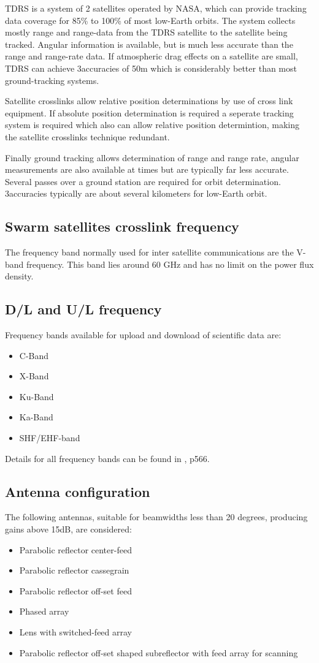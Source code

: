 TDRS is a system of 2 satellites operated by NASA, which can provide tracking data coverage for 85\% to 100\% of most low-Earth orbits. The system collects mostly range and range-data from the TDRS satellite to the satellite being tracked. Angular information is available, but is much less accurate than the range and range-rate data. If atmospheric drag effects on a satellite are small, TDRS can achieve 3\sigma accuracies of 50m which is considerably better than most ground-tracking systems.

Satellite crosslinks allow relative position determinations by use of cross link equipment. If absolute position determination is required a seperate tracking system is required which also can allow relative position determintion, making the satellite crosslinks technique redundant.

Finally ground tracking allows determination of range and range rate, angular measurements are also available at times but are typically far less accurate. Several passes over a ground station are required for orbit determination. 3\sigma accuracies typically are about several kilometers for low-Earth orbit.

\subsection{Swarm satellites crosslink frequency}
The frequency band normally used for inter satellite communications are the V-band frequency. This band lies around 60 GHz and has no limit on the power flux density.

\subsection{D/L and U/L frequency}
Frequency bands available for upload and download of scientific data are:
\begin{itemize}
\item C-Band
\item X-Band
\item Ku-Band
\item Ka-Band
\item SHF/EHF-band
\end{itemize}

Details for all frequency bands can be found in \cite{Larson}, p566.

\subsection{Antenna configuration}
The following antennas, suitable for beamwidths less than 20 degrees, producing gains above 15dB, are considered:
\begin{itemize}
\item Parabolic reflector center-feed
\item Parabolic reflector cassegrain
\item Parabolic reflector off-set feed
\item Phased array
\item Lens with switched-feed array
\item Parabolic reflector off-set shaped subreflector with feed array for scanning
\end{itemize}

